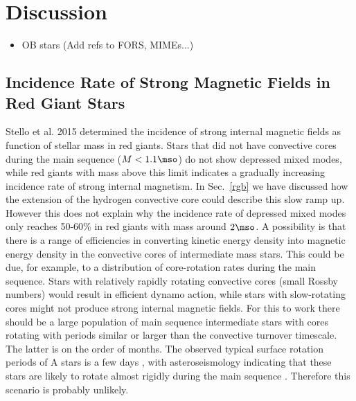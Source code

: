 \section{Discussion}
\begin{itemize}
\item OB stars (Add refs to FORS, MIMEs...)
\end{itemize}

\subsection{Incidence Rate of Strong Magnetic Fields in Red Giant Stars}
Stello et al. 2015 determined the incidence of strong internal magnetic fields as function of stellar mass in red giants. Stars that did not have convective cores during the main sequence ($M<1.1\mso$) do not show depressed mixed modes, while red giants with mass above this limit indicates a gradually increasing incidence rate of strong internal magnetism.    In Sec.~\ref{rgb} we have discussed how the extension of the hydrogen convective core could describe this slow ramp up. However this does not explain why the incidence rate of depressed mixed modes only reaches 50-60\% in red giants with mass around $2\mso$.
A possibility is that there is a range of efficiencies in converting kinetic energy density into magnetic energy density in the convective cores of intermediate mass stars. This could be due, for example, to a distribution of core-rotation rates during the main sequence. Stars with relatively rapidly rotating convective cores (small Rossby numbers) would result in efficient dynamo action, while stars with slow-rotating cores might not produce strong internal magnetic fields. For this to work there should be a large population of main sequence intermediate stars with cores rotating with periods similar or larger than the convective turnover timescale. The latter is on the order of months. The  observed typical surface rotation periods of A stars is a few days \citep{Zorec_2012}, with  asteroseismology indicating that these stars are likely to rotate almost rigidly during the main sequence \citep[e.g.][]{Benomar_2015}. Therefore this scenario is probably unlikely.

